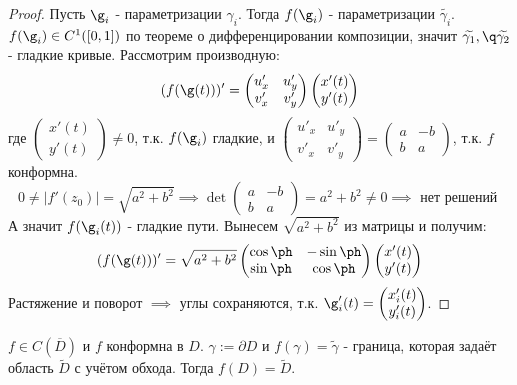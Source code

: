 \begin{proof}
  Пусть $\g_i$ - параметризации $\gamma_i$. Тогда $f(\g_i)$ - параметризации $\widetilde{\gamma_i}$. $f(\g_i)\in C^1([0,1])$ по теореме о дифференцировании композиции, значит $\widetilde{\gamma_1},\q \widetilde{\gamma_2}$ - гладкие кривые. Рассмотрим производную:
  \[(f(\g(t)))' = \begin{pmatrix}u'_x&u'_y\\v'_x&v'_y\end{pmatrix}\begin{pmatrix}x'(t)\\y'(t)\end{pmatrix}\]
    где $\begin{pmatrix}x'(t)\\y'(t)\end{pmatrix}\neq 0$, т.к. $f(\g_i)$ гладкие, и $\begin{pmatrix}u'_x&u'_y\\v'_x&v'_y\end{pmatrix} = \begin{pmatrix}a&-b\\b&a\end{pmatrix}$, т.к. $f$ конформна. 
        \[0\neq |f'(z_0)| = \sqrt{a^2+b^2}\implies \det \begin{pmatrix}a&-b\\b&a\end{pmatrix}=a^2+b^2\neq 0\implies \text{ нет решений }\]
    А значит $f(\g_i(t))$ - гладкие пути. Вынесем $\sqrt{a^2+b^2}$ из матрицы и получим:
    \[(f(\g(t)))'=\sqrt{a^2+b^2}\begin{pmatrix}\cos\ph&-\sin\ph\\\sin\ph&\cos\ph\end{pmatrix}\begin{pmatrix}x'(t)\\y'(t)\end{pmatrix} \]
      Растяжение и поворот $\implies$ углы сохраняются, т.к. $\g_i'(t)=\begin{pmatrix}x_i'(t)\\y_i'(t)\end{pmatrix}$.
\end{proof}
\begin{theorem}
  $f\in C(\overline{D})$ и $f$ конформна в $D$. $\gamma:=\partial D$ и $f(\gamma)=\widetilde{\gamma}$ - граница, которая задаёт область $\widetilde{D}$ с учётом обхода. Тогда $f(D)=\widetilde{D}$. 
\end{theorem}
